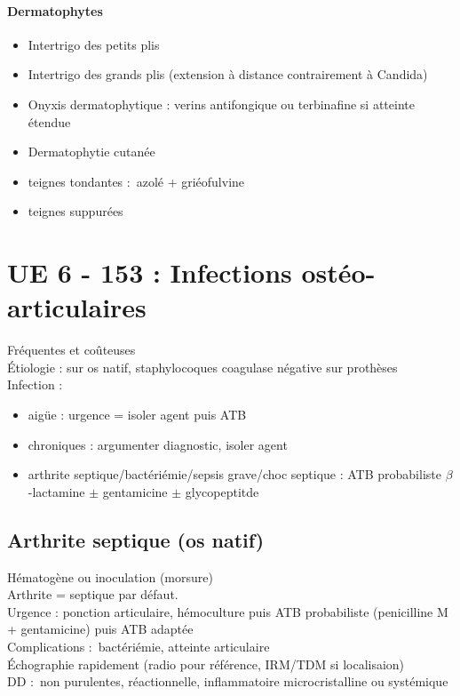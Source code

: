 \documentclass{article}
\begin{document}
\paragraph{Dermatophytes}
\begin{itemize}
  \item Intertrigo des petits plis
  \item Intertrigo des grands plis (extension à distance contrairement à Candida)
  \item Onyxis dermatophytique : verins antifongique ou terbinafine si atteinte
    étendue
  \item Dermatophytie cutanée
  \item teignes tondantes : azolé + griéofulvine
  \item teignes suppurées
\end{itemize}

\section{UE 6 - 153 : Infections ostéo-articulaires}%
\label{sec:ue_6_153_infections_osteo_articulaires}
Fréquentes et coûteuses\\
Étiologie :  sur os natif, staphylocoques coagulase négative sur
prothèses\\
Infection :
\begin{itemize}
  \item aigüe : \danger urgence = isoler agent puis ATB
  \item chroniques : argumenter diagnostic, isoler agent
    \item arthrite septique/bactériémie/sepsis grave/choc septique : ATB
      probabiliste $\beta$-lactamine $\pm$ gentamicine $\pm$ glycopeptitde
\end{itemize}

\subsection{Arthrite septique (os natif)}
Hématogène ou inoculation (morsure)\\
Arthrite = septique par défaut. \\
Urgence \skull : ponction articulaire, hémoculture puis ATB probabiliste
(penicilline M + gentamicine) puis ATB adaptée\\
Complications : bactériémie, atteinte articulaire\\
Échographie rapidement (radio pour référence, IRM/TDM si localisaion)\\
DD : non purulentes, réactionnelle, inflammatoire microcristalline ou systémique
\end{document}
